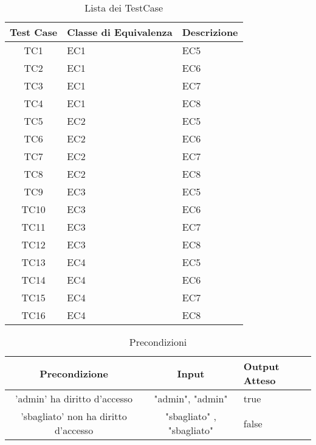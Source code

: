\begin{table}[H]
    \centering
    \footnotesize
    \caption{Lista dei TestCase}
    \begin{tabularx}{\textwidth}{|c|X|X|}
        \hline
        Test Case & Classe di Equivalenza & Descrizione\\
        \hline
        TC1 & EC1 & EC5  \\
        \hline
        TC2 & EC1 & EC6  \\
        \hline
        TC3 & EC1 & EC7  \\
        \hline
        TC4 & EC1 & EC8  \\
        \hline
        TC5 & EC2 & EC5  \\
        \hline
        TC6 & EC2 & EC6  \\
        \hline
        TC7 & EC2 & EC7  \\
        \hline
        TC8 & EC2 & EC8  \\
        \hline
        TC9 & EC3 & EC5  \\
        \hline
        TC10 & EC3 & EC6  \\
        \hline
        TC11 & EC3 & EC7  \\
        \hline
        TC12 & EC3 & EC8  \\
        \hline
        TC13 & EC4 & EC5  \\
        \hline
        TC14 & EC4 & EC6  \\
        \hline
        TC15 & EC4 & EC7  \\
        \hline
        TC16 & EC4 & EC8  \\
        \hline
    \end{tabularx}
    \setlength{\tabcolsep}{8pt}
    \renewcommand{\arraystretch}{1.5}
\end{table}
\begin{table}[H]
    \centering
    \footnotesize
    \caption{Precondizioni}
    \begin{tabularx}{\textwidth}{|c|c|X|}
        \hline
        Precondizione & Input & Output Atteso\\
        \hline
        'admin' ha diritto d'accesso & "admin", "admin" & true\\
        \hline
        'sbagliato' non ha diritto d'accesso & "sbagliato" , "sbagliato" & false\\
        \hline
    \end{tabularx}
\end{table}




       
